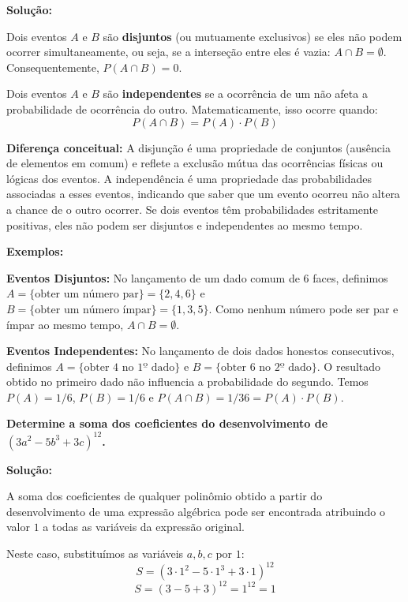 \documentclass[a4paper,10pt,landscape,twocolumn]{article}  %
\let\oldenumerate\enumerate
\let\oldendenumerate\endenumerate
\renewenvironment{enumerate}{%
  \oldenumerate%
  \setlength{\itemsep}{1pt}%
  \setlength{\parskip}{0pt}%
  \setlength{\parsep}{0pt}%
  \setlength{\topsep}{2pt}%
  \setlength{\partopsep}{0pt}%
}{%
  \oldendenumerate%
}
\let\olditemize\itemize
\let\oldenditemize\enditemize
\renewenvironment{itemize}{%
  \olditemize%
  \setlength{\itemsep}{1pt}%
  \setlength{\parskip}{0pt}%
  \setlength{\parsep}{0pt}%
  \setlength{\topsep}{2pt}%
  \setlength{\partopsep}{0pt}%
}{%
  \oldenditemize%
}
\begin{document}
\begin{enumerate}
    \textbf{Solução:}
    
    Dois eventos $A$ e $B$ são \textbf{disjuntos} (ou mutuamente exclusivos) se eles não podem ocorrer simultaneamente, ou seja, se a interseção entre eles é vazia: $A \cap B = \emptyset$. Consequentemente, $P(A \cap B) = 0$.
    
    Dois eventos $A$ e $B$ são \textbf{independentes} se a ocorrência de um não afeta a probabilidade de ocorrência do outro. Matematicamente, isso ocorre quando:
    \[ P(A \cap B) = P(A) \cdot P(B) \]
    
    \textbf{Diferença conceitual:} A disjunção é uma propriedade de conjuntos (ausência de elementos em comum) e reflete a exclusão mútua das ocorrências físicas ou lógicas dos eventos. A independência é uma propriedade das probabilidades associadas a esses eventos, indicando que saber que um evento ocorreu não altera a chance de o outro ocorrer. Se dois eventos têm probabilidades estritamente positivas, eles não podem ser disjuntos e independentes ao mesmo tempo.
    
    \textbf{Exemplos:}
    \begin{itemize}
        \item \textbf{Eventos Disjuntos:} No lançamento de um dado comum de 6 faces, definimos $A = \{\text{obter um número par}\} = \{2, 4, 6\}$ e $B = \{\text{obter um número ímpar}\} = \{1, 3, 5\}$. Como nenhum número pode ser par e ímpar ao mesmo tempo, $A \cap B = \emptyset$.
        \item \textbf{Eventos Independentes:} No lançamento de dois dados honestos consecutivos, definimos $A = \{\text{obter 4 no 1º dado}\}$ e $B = \{\text{obter 6 no 2º dado}\}$. O resultado obtido no primeiro dado não influencia a probabilidade do segundo. Temos $P(A) = 1/6$, $P(B) = 1/6$ e $P(A \cap B) = 1/36 = P(A) \cdot P(B)$.
    \end{itemize}
    
    \item \textbf{Determine a soma dos coeficientes do desenvolvimento de $(3a^2 - 5b^3 + 3c)^{12}$.}
    
    \textbf{Solução:}
    
    A soma dos coeficientes de qualquer polinômio obtido a partir do desenvolvimento de uma expressão algébrica pode ser encontrada atribuindo o valor $1$ a todas as variáveis da expressão original. 
    
    Neste caso, substituímos as variáveis $a, b, c$ por $1$:
    \[ S = (3 \cdot 1^2 - 5 \cdot 1^3 + 3 \cdot 1)^{12} \]
    \[ S = (3 - 5 + 3)^{12} = 1^{12} = 1 \]
    

\end{enumerate}
\end{document}
